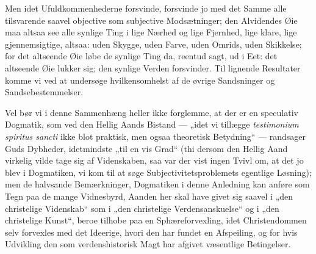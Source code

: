 \documentclass[11pt]{book}
\begin{document}
Men idet Ufuldkommenhederne forsvinde, forsvinde jo med det Samme
alle tilsvarende saavel objective som subjective Modsætninger; den
Alvidendes Øie maa altsaa see alle synlige Ting i lige Nærhed og
lige Fjernhed, lige klare, lige gjennemsigtige, altsaa: uden Skygge,
uden Farve, uden Omrids, uden Skikkelse; for det altseende Øie løbe
de synlige Ting da, reentud sagt, ud i Eet: det altseende Øie lukker
sig; den synlige Verden forsvinder. Til lignende Resultater komme vi
ved at undersøge hvilkensomhelst af de øvrige Sandsninger og
Sandsebestemmelser.

Vel bør vi i denne Sammenhæng heller ikke forglemme, at der er en
speculativ Dogmatik, som ved den Hellig Aands Bistand --- „idet vi
tillægge \textit{testimonium spiritus sancti} ikke blot praktisk,
men ogsaa theoretisk Betydning“ --- randsager Guds Dybheder,
idetmindste „til en vis Grad“ (thi dersom den Hellig Aand virkelig
vilde tage sig af Videnskaben, saa var der vist ingen Tvivl om, at
det jo blev i Dogmatiken, vi kom til at søge
Subjectivitetsproblemets egentlige Løsning); men de halvsande
Bemærkninger, Dogmatiken i denne Anledning kan anføre som Tegn paa
de mange Vidnesbyrd, Aanden her skal have givet sig saavel i „den
christelige Videnskab“ som i „den christelige Verdensanskuelse“ og i
„den christelige Kunst“, beroe tilhobe paa en Sphæreforvexling, idet
Christendommen selv forvexles med det Ideerige, hvori den har fundet
en Afspeiling, og for hvis Udvikling den som verdenshistorisk Magt
har afgivet væsentlige Betingelser.
\end{document}
